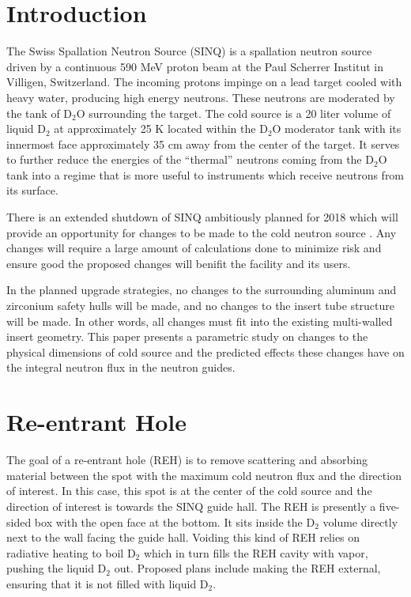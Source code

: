 \documentclass[preprint,12pt]{elsarticle}
\begin{document}

\section{Introduction}
\label{sec:intro}

The Swiss Spallation Neutron Source (SINQ) is a spallation neutron source driven by a continuous 590 MeV proton beam at the Paul Scherrer Institut in Villigen, Switzerland.  The incoming protons impinge on a lead target cooled with heavy water, producing high energy neutrons.  These neutrons are moderated by the tank of D$_2$O surrounding the target.  The cold source is a 20 liter volume of liquid D$_2$ at approximately 25 K located within the D$_2$O moderator tank with its innermost face approximately 35 cm away from the center of the target.  It serves to further reduce the energies of the ``thermal'' neutrons coming from the D$_2$O tank into a regime that is more useful to instruments which receive neutrons from its surface.  

There is an extended shutdown of SINQ ambitiously planned for 2018 which will provide an opportunity for changes to be made to the cold neutron source \cite{rueegg_icans}.  Any changes will require a large amount of calculations done to minimize risk and ensure good the proposed changes will benifit the facility and its users.  

In the planned upgrade strategies, no changes to the surrounding aluminum and zirconium safety hulls will be made, and no changes to the insert tube structure will be made.  In other words, all changes must fit into the existing multi-walled insert geometry.  This paper presents a parametric study on changes to the physical dimensions of cold source and the predicted effects these changes have on the integral neutron flux in the neutron guides.

\section{Re-entrant Hole}

The goal of a re-entrant hole (REH) is to remove scattering and absorbing material between the spot with the maximum cold neutron flux and the direction of interest.  In this case, this spot is at the center of the cold source and the direction of interest is towards the SINQ guide hall.  The REH is presently a five-sided box with the open face at the bottom.  It sits inside the D$_2$ volume directly next to the wall facing the guide hall.  Voiding this kind of REH relies on radiative heating to boil D$_2$ which in turn fills the REH cavity with vapor, pushing the liquid D$_2$ out.  Proposed plans include making the REH external, ensuring that it is not filled with liquid D$_2$.
\end{document}
